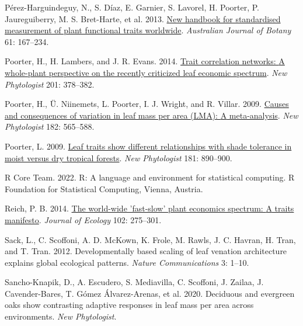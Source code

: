 \documentclass[
  12pt,
  a4paper,
,tablecaptionabove
]{scrartcl}
\newlength{\cslhangindent}
\newenvironment{CSLReferences}[2] %
 {%
  \setlength{\parindent}{0pt}
  \ifodd #1 \everypar{\setlength{\hangindent}{\cslhangindent}}\ignorespaces\fi
  \ifnum #2 > 0
  \setlength{\parskip}{#2\baselineskip}
  \fi
 }%
 {}
\begin{document}
\begin{CSLReferences}{1}{0}
\leavevmode{}%
Pérez-Harguindeguy, N., S. Díaz, E. Garnier, S. Lavorel, H. Poorter, P. Jaureguiberry, M. S. Bret-Harte, et al. 2013. \href{https://doi.org/10.1071/BT12225}{New handbook for standardised measurement of plant functional traits worldwide}. \emph{Australian Journal of Botany} 61: 167--234.

\leavevmode{}%
Poorter, H., H. Lambers, and J. R. Evans. 2014. \href{https://doi.org/10.1111/nph.12547}{Trait correlation networks: {A} whole-plant perspective on the recently criticized leaf economic spectrum}. \emph{New Phytologist} 201: 378--382.

\leavevmode{}%
Poorter, H., Ü. Niinemets, L. Poorter, I. J. Wright, and R. Villar. 2009. \href{https://doi.org/10.1111/j.1469-8137.2009.02830.x}{Causes and consequences of variation in leaf mass per area ({LMA}): {A} meta-analysis}. \emph{New Phytologist} 182: 565--588.

\leavevmode{}%
Poorter, L. 2009. \href{https://doi.org/10.1111/j.1469-8137.2008.02715.x}{Leaf traits show different relationships with shade tolerance in moist versus dry tropical forests}. \emph{New Phytologist} 181: 890--900.

\leavevmode{}%
R Core Team. 2022. R: {A} language and environment for statistical computing. {R Foundation for Statistical Computing}, {Vienna, Austria}.

\leavevmode{}%
Reich, P. B. 2014. \href{https://doi.org/10.1111/1365-2745.12211}{The world-wide 'fast-slow' plant economics spectrum: {A} traits manifesto}. \emph{Journal of Ecology} 102: 275--301.

\leavevmode{}%
Sack, L., C. Scoffoni, A. D. McKown, K. Frole, M. Rawls, J. C. Havran, H. Tran, and T. Tran. 2012. Developmentally based scaling of leaf venation architecture explains global ecological patterns. \emph{Nature Communications} 3: 1--10.

\leavevmode{}%
Sancho-Knapik, D., A. Escudero, S. Mediavilla, C. Scoffoni, J. Zailaa, J. Cavender-Bares, T. Gómez Álvarez-Arenas, et al. 2020. Deciduous and evergreen oaks show contrasting adaptive responses in leaf mass per area across environments. \emph{New Phytologist}.


\end{CSLReferences}
\end{document}
